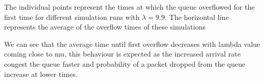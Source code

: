 The individual points represent the times at which the queue overflowed for the first time for different simulation runs with $\lambda=9.9$.
The horizontal line represents the average of the overflow times of these simulations


We can see that the average time until first overflow decreases with lambda value coming close to mu, this behaviour is expected as the increased arrival rate congest the queue faster and probability of a packet dropped from the queue increase at lower times.
